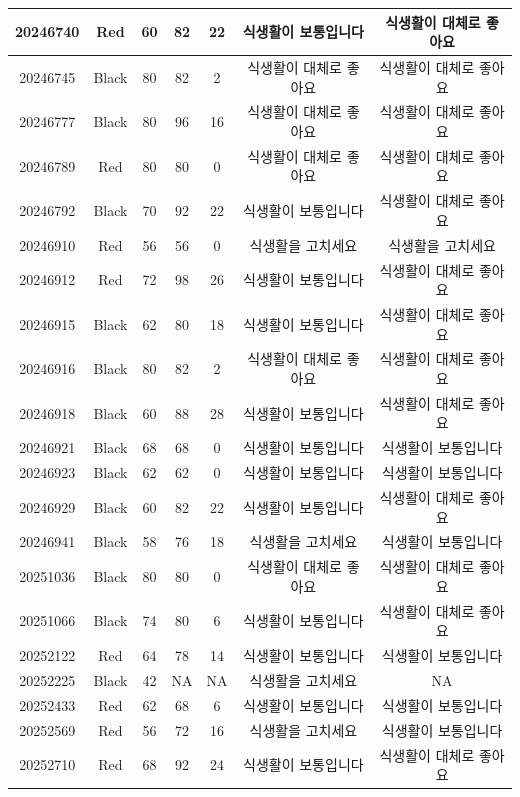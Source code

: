 \documentclass[
]{book}
\begin{document}
\begin{tabular}{c|c|c|c|c|c|c}
\hline
20246740 & Red & 60 & 82 & 22 & 식생활이 보통입니다 & 식생활이 대체로 좋아요\\
\hline
20246745 & Black & 80 & 82 & 2 & 식생활이 대체로 좋아요 & 식생활이 대체로 좋아요\\
\hline
20246777 & Black & 80 & 96 & 16 & 식생활이 대체로 좋아요 & 식생활이 대체로 좋아요\\
\hline
20246789 & Red & 80 & 80 & 0 & 식생활이 대체로 좋아요 & 식생활이 대체로 좋아요\\
\hline
20246792 & Black & 70 & 92 & 22 & 식생활이 보통입니다 & 식생활이 대체로 좋아요\\
\hline
20246910 & Red & 56 & 56 & 0 & 식생활을 고치세요 & 식생활을 고치세요\\
\hline
20246912 & Red & 72 & 98 & 26 & 식생활이 보통입니다 & 식생활이 대체로 좋아요\\
\hline
20246915 & Black & 62 & 80 & 18 & 식생활이 보통입니다 & 식생활이 대체로 좋아요\\
\hline
20246916 & Black & 80 & 82 & 2 & 식생활이 대체로 좋아요 & 식생활이 대체로 좋아요\\
\hline
20246918 & Black & 60 & 88 & 28 & 식생활이 보통입니다 & 식생활이 대체로 좋아요\\
\hline
20246921 & Black & 68 & 68 & 0 & 식생활이 보통입니다 & 식생활이 보통입니다\\
\hline
20246923 & Black & 62 & 62 & 0 & 식생활이 보통입니다 & 식생활이 보통입니다\\
\hline
20246929 & Black & 60 & 82 & 22 & 식생활이 보통입니다 & 식생활이 대체로 좋아요\\
\hline
20246941 & Black & 58 & 76 & 18 & 식생활을 고치세요 & 식생활이 보통입니다\\
\hline
20251036 & Black & 80 & 80 & 0 & 식생활이 대체로 좋아요 & 식생활이 대체로 좋아요\\
\hline
20251066 & Black & 74 & 80 & 6 & 식생활이 보통입니다 & 식생활이 대체로 좋아요\\
\hline
20252122 & Red & 64 & 78 & 14 & 식생활이 보통입니다 & 식생활이 보통입니다\\
\hline
20252225 & Black & 42 & NA & NA & 식생활을 고치세요 & NA\\
\hline
20252433 & Red & 62 & 68 & 6 & 식생활이 보통입니다 & 식생활이 보통입니다\\
\hline
20252569 & Red & 56 & 72 & 16 & 식생활을 고치세요 & 식생활이 보통입니다\\
\hline
20252710 & Red & 68 & 92 & 24 & 식생활이 보통입니다 & 식생활이 대체로 좋아요\\

\end{tabular}
\end{document}
